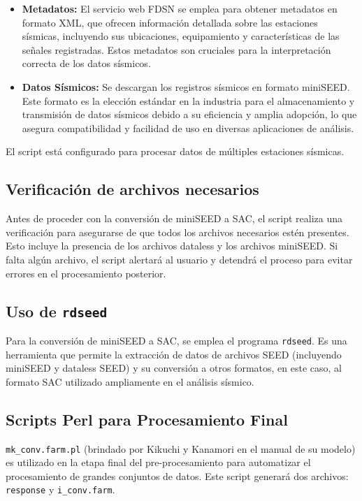 \documentclass[a4paper,11pt]{refart}
\begin{document}
\begin{itemize}
    \item \textbf{Metadatos:} El servicio web FDSN se emplea para obtener metadatos en formato XML, que ofrecen información detallada sobre las estaciones sísmicas, incluyendo sus ubicaciones, equipamiento y características de las señales registradas. Estos metadatos son cruciales para la interpretación correcta de los datos sísmicos.
    \item \textbf{Datos Sísmicos:} Se descargan los registros sísmicos en formato miniSEED. Este formato es la elección estándar en la industria para el almacenamiento y transmisión de datos sísmicos debido a su eficiencia y amplia adopción, lo que asegura compatibilidad y facilidad de uso en diversas aplicaciones de análisis.
\end{itemize}

El script está configurado para procesar datos de múltiples estaciones sísmicas.

\subsection{Verificación de archivos necesarios}

Antes de proceder con la conversión de miniSEED a SAC, el script realiza una verificación para asegurarse de que todos los archivos necesarios estén presentes. Esto incluye la presencia de los archivos dataless y los archivos miniSEED. Si falta algún archivo, el script alertará al usuario y detendrá el proceso para evitar errores en el procesamiento posterior.

\subsection{Uso de \texttt{rdseed}}

Para la conversión de miniSEED a SAC, se emplea el programa \texttt{rdseed}. Es una herramienta que permite la extracción de datos de archivos SEED (incluyendo miniSEED y dataless SEED) y su conversión a otros formatos, en este caso, al formato SAC utilizado ampliamente en el análisis sísmico.

\subsection{Scripts Perl para Procesamiento Final}

\texttt{mk\_conv.farm.pl} (brindado por Kikuchi y Kanamori en el manual de su modelo) es utilizado en la etapa final del pre-procesamiento para automatizar el procesamiento de grandes conjuntos de datos. Este script generará dos archivos: \texttt{response} y \texttt{i\_conv.farm}.
\end{document}
